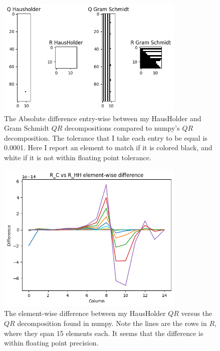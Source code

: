 \begin{solution}
\begin{figure}[ht]
    \centering
    \includegraphics[width = 0.8\textwidth]{Images/QR Decomp problems.png}
    \caption{The Absolute difference entry-wise between my HausHolder and Gram Schmidt $QR$ decompositions compared to numpy's $QR$ decomposition. The tolerance that I take each entry to be equal is 0.0001. Here I report an element to match if it is colored black, and white if it is not within floating point tolerance.}
    \label{fig:p6e qr diff}
\end{figure}

\begin{figure}[ht]
    \centering
    \includegraphics[width = 0.8\textwidth]{Images/R_C vs R_HH.png}
    \caption{The element-wise difference between my HausHolder $QR$ versus the $QR$ decomposition found in numpy. Note the lines are the rows in $R$, where they span 15 elements each. It seems that the difference is within floating point precision. }
    \label{fig:p6d R_HH difference}
\end{figure}


\end{solution}
